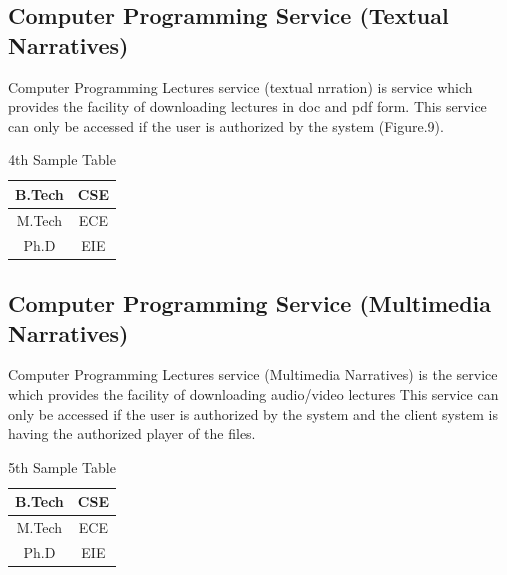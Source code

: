 
\subsection{Computer Programming Service (Textual Narratives)}
Computer Programming Lectures service (textual nrration) is service which provides the facility of downloading lectures in doc and 
pdf form. This service can only be accessed if the user is authorized by the system (Figure.9). 

\begin{table}
 \begin{center}
 \caption{4th Sample Table}
 \begin{tabular}{|c|c|}
 \hline
 B.Tech & CSE\\
 \hline
 M.Tech & ECE\\
 \hline
 Ph.D & EIE\\
 \hline 
 \end{tabular}
 \end{center}
\end{table} 


\subsection{Computer Programming Service (Multimedia Narratives)}
Computer Programming Lectures service (Multimedia Narratives) is the service which provides the facility of downloading audio/video lectures
 This service can only be accessed if the user is authorized by the system and the client system is having the authorized player of the files. 
 
 \begin{table}
 \begin{center}
 \caption{5th Sample Table}
 \begin{tabular}{|c|c|}
 \hline
 B.Tech & CSE\\
 \hline
 M.Tech & ECE\\
 \hline
 Ph.D & EIE\\
 \hline 
 \end{tabular}
 \end{center}
\end{table} 
